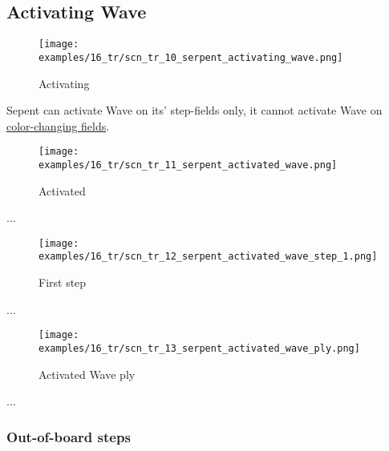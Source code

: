\subsection*{Activating Wave}

\noindent
\begin{wrapfigure}[3]{l}{0.4\textwidth}
\centering
\texttt{[image: examples/16\_tr/scn\_tr\_10\_serpent\_activating\_wave.png]}
\caption{Activating}
\label{fig:scn_tr_10_serpent_activating_wave}
\end{wrapfigure}
Sepent can activate Wave on its' step-fields only, it cannot activate Wave
on \hyperref[fig:scn_tr_06_serpent_neighbors]{color-changing fields}.

\vspace*{7.0\baselineskip}
\noindent
\begin{wrapfigure}[1]{l}{0.4\textwidth}
\centering
\texttt{[image: examples/16\_tr/scn\_tr\_11\_serpent\_activated\_wave.png]}
\caption{Activated}
\label{fig:scn_tr_11_serpent_activated_wave}
\end{wrapfigure}
...

\vspace*{8.0\baselineskip}
\noindent
\begin{wrapfigure}[1]{l}{0.4\textwidth}
\centering
\texttt{[image: examples/16\_tr/scn\_tr\_12\_serpent\_activated\_wave\_step\_1.png]}
\caption{First step}
\label{fig:scn_tr_12_serpent_activated_wave_step_1}
\end{wrapfigure}
...

\clearpage %

\noindent
\begin{figure}[!h]
\texttt{[image: examples/16\_tr/scn\_tr\_13\_serpent\_activated\_wave\_ply.png]}
\caption{Activated Wave ply}
\label{fig:scn_tr_13_serpent_activated_wave_ply}
\end{figure}

...

\clearpage %

\subsubsection*{Out-of-board steps}

